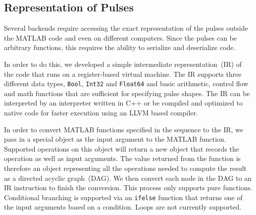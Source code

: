 \subsection{Representation of Pulses}
\label{ch:computer-control:backend:pulse-repr}
Several backends require accessing the exact representation of the pulses
outside the MATLAB code and even on different computers.
Since the pulses can be arbitrary functions,
this requires the ability to serialize and deserialize code.

In order to do this, we developed a simple intermediate representation~(IR)
of the code that runs on a register-based virtual machine.
The IR supports three different data types, \verb`Bool`, \verb`Int32` and \verb`Float64`
and basic arithmetic, control flow and math functions
that are sufficient for specifying pulse shapes.
The IR can be interpreted by an interpreter written in C++ or
be compiled and optimized to native code for faster execution using an LLVM based compiler.

In order to convert MATLAB functions specified in the sequence to the IR,
we pass in a special object as the input argument to the MATLAB function.
Supported operations on this object will return a new object
that records the operation as well as input arguments.
The value returned from the function is therefore an object representing
all the operations needed to compute the result as a directed acyclic graph~(DAG).
We then convert each node in the DAG to an IR instruction to finish the conversion.
This process only supports pure functions.
Conditional branching is supported via an \verb`ifelse` function
that returns one of the input arguments based on a condition.
Loops are not currently supported.

